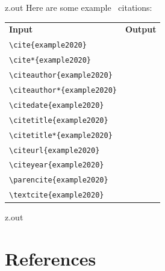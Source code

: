 \MyIO


\begin{VerbatimOut}{z.out}
Here are some example \BibLaTeXLogo\ citations:
\mbox{}\\
\begin{tabular}{@{}ll@{}}
  \bf Input&                        \bf Output\\
  \verb+\cite{example2020}+&        \cite{example2020}\\
  \verb+\cite*{example2020}+&       \cite*{example2020}\\
  \verb+\citeauthor{example2020}+&  \citeauthor{example2020}\\
  \verb+\citeauthor*{example2020}+& \citeauthor*{example2020}\\
  \verb+\citedate{example2020}+&    \citedate{example2020}\\
  \verb+\citetitle{example2020}+&   \citetitle{example2020}\\
  \verb+\citetitle*{example2020}+&  \citetitle*{example2020}\\
  \verb+\citeurl{example2020}+&     \citeurl{example2020}\\
  \verb+\citeyear{example2020}+&    \citeyear{example2020}\\
  \verb+\parencite{example2020}+&   \parencite{example2020}\\
  \verb+\textcite{example2020}+&    \textcite{example2020}\\
\end{tabular}
\end{VerbatimOut}

\MyIO


\begin{VerbatimOut}{z.out}


\section{References}
\end{VerbatimOut}

\MyIO



